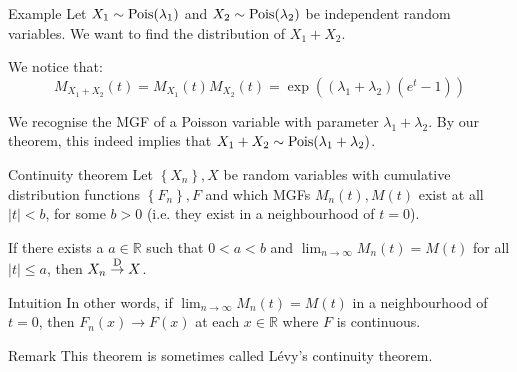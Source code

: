 \documentclass[a4paper]{article}
\begin{document}
\begin{parag}{Example}
    Let $X_1 \followsdistr \text{Pois}\left(\lambda_1\right)$ and $X_2 \followsdistr \text{Pois}\left(\lambda_2\right)$ be independent random variables. We want to find the distribution of $X_1 + X_2$.

    We notice that: 
    \[M_{X_1 + X_2}\left(t\right) = M_{X_1}\left(t\right)  M_{X_2}\left(t\right) = \exp\left(\left(\lambda_1 + \lambda_2\right)\left(e^t - 1\right)\right)\]
    
    We recognise the MGF of a Poisson variable with parameter $\lambda_1 + \lambda_2$. By our theorem, this indeed implies that $X_1 + X_2 \followsdistr \text{Pois}\left(\lambda_1 + \lambda_2\right)$.
\end{parag}

\begin{parag}{Continuity theorem}
    Let $\left\{X_n\right\}, X$ be random variables with cumulative distribution functions $\left\{F_n\right\}, F$ and which MGFs $M_n\left(t\right), M\left(t\right)$ exist at all $\left|t\right| < b$, for some $b > 0$ (i.e. they exist in a neighbourhood of $t = 0$).

    If there exists a $a \in \mathbb{R}$ such that $0 < a < b$ and $\lim_{n \to \infty} M_n\left(t\right) = M\left(t\right)$ for all $\left|t\right| \leq a$, then $X_n \over{\to}{D} X$.
    
    \begin{subparag}{Intuition}
        In other words, if $\lim_{n \to \infty} M_n\left(t\right) = M\left(t\right)$ in a neighbourhood of $t = 0$, then $F_n\left(x\right) \to F\left(x\right)$ at each $x \in \mathbb{R}$ where $F$ is continuous. 
    \end{subparag}

    \begin{subparag}{Remark}
        This theorem is sometimes called Lévy's continuity theorem.
    \end{subparag}
\end{parag}
\end{document}
